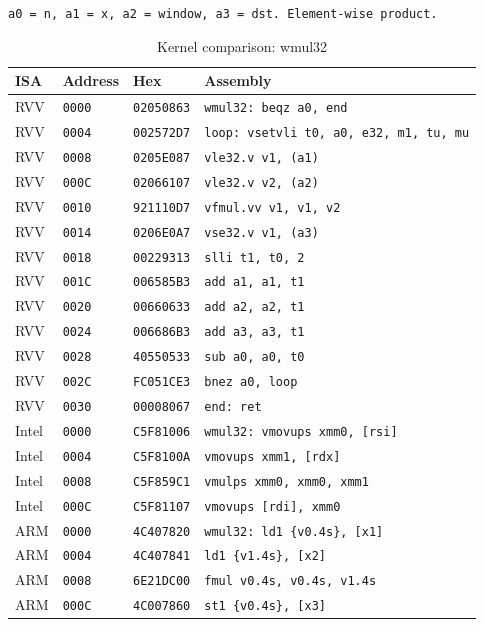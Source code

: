 \begin{table}[htbp]
\centering
\caption{Kernel comparison: wmul32}
\begingroup
\scriptsize
\setlength{\tabcolsep}{4pt}
\noindent \texttt{a0 = n, a1 = x, a2 = window, a3 = dst. Element-wise product.}\par
\vspace{0.6ex}
\begin{tabular}{@{}l|l|l|p{7.2cm}@{}}
\toprule
ISA & Address & Hex & Assembly \\
\midrule
RVV & \texttt{0000} & \texttt{02050863} & \texttt{wmul32: beqz a0, end} \\
RVV & \texttt{0004} & \texttt{002572D7} & \texttt{loop: vsetvli t0, a0, e32, m1, tu, mu} \\
RVV & \texttt{0008} & \texttt{0205E087} & \texttt{vle32.v v1, (a1)} \\
RVV & \texttt{000C} & \texttt{02066107} & \texttt{vle32.v v2, (a2)} \\
RVV & \texttt{0010} & \texttt{921110D7} & \texttt{vfmul.vv v1, v1, v2} \\
RVV & \texttt{0014} & \texttt{0206E0A7} & \texttt{vse32.v v1, (a3)} \\
RVV & \texttt{0018} & \texttt{00229313} & \texttt{slli t1, t0, 2} \\
RVV & \texttt{001C} & \texttt{006585B3} & \texttt{add a1, a1, t1} \\
RVV & \texttt{0020} & \texttt{00660633} & \texttt{add a2, a2, t1} \\
RVV & \texttt{0024} & \texttt{006686B3} & \texttt{add a3, a3, t1} \\
RVV & \texttt{0028} & \texttt{40550533} & \texttt{sub a0, a0, t0} \\
RVV & \texttt{002C} & \texttt{FC051CE3} & \texttt{bnez a0, loop} \\
RVV & \texttt{0030} & \texttt{00008067} & \texttt{end: ret} \\
\midrule
Intel & \texttt{0000} & \texttt{C5F81006} & \texttt{wmul32: vmovups xmm0, [rsi]} \\
Intel & \texttt{0004} & \texttt{C5F8100A} & \texttt{vmovups xmm1, [rdx]} \\
Intel & \texttt{0008} & \texttt{C5F859C1} & \texttt{vmulps xmm0, xmm0, xmm1} \\
Intel & \texttt{000C} & \texttt{C5F81107} & \texttt{vmovups [rdi], xmm0} \\
\midrule
ARM & \texttt{0000} & \texttt{4C407820} & \texttt{wmul32: ld1 \{v0.4s\}, [x1]} \\
ARM & \texttt{0004} & \texttt{4C407841} & \texttt{ld1 \{v1.4s\}, [x2]} \\
ARM & \texttt{0008} & \texttt{6E21DC00} & \texttt{fmul v0.4s, v0.4s, v1.4s} \\
ARM & \texttt{000C} & \texttt{4C007860} & \texttt{st1 \{v0.4s\}, [x3]} \\
\bottomrule
\end{tabular}
\endgroup
\end{table}
\noindent{}\par
